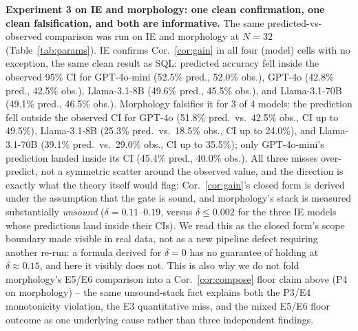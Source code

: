 \documentclass[11pt]{article}
\begin{document}
\textbf{Experiment 3 on IE and morphology: one clean confirmation, one clean falsification, and both are informative.} The same predicted-vs-observed comparison was run on IE and morphology at $N=32$ (Table~\ref{tab:params}). IE confirms Cor.~\ref{cor:gain} in all four (model) cells with no exception, the same clean result as SQL: predicted accuracy fell inside the observed 95\% CI for GPT-4o-mini (52.5\% pred., 52.0\% obs.), GPT-4o (42.8\% pred., 42.5\% obs.), Llama-3.1-8B (49.6\% pred., 45.5\% obs.), and Llama-3.1-70B (49.1\% pred., 46.5\% obs.). Morphology falsifies it for 3 of 4 models: the prediction fell outside the observed CI for GPT-4o (51.8\% pred.\ vs.\ 42.5\% obs., CI up to 49.5\%), Llama-3.1-8B (25.3\% pred.\ vs.\ 18.5\% obs., CI up to 24.0\%), and Llama-3.1-70B (39.1\% pred.\ vs.\ 29.0\% obs., CI up to 35.5\%); only GPT-4o-mini's prediction landed inside its CI (45.4\% pred., 40.0\% obs.). All three misses over-predict, not a symmetric scatter around the observed value, and the direction is exactly what the theory itself would flag: Cor.~\ref{cor:gain}'s closed form is derived under the assumption that the gate is sound, and morphology's stack is measured substantially \emph{unsound} ($\delta=0.11$--$0.19$, versus $\delta\le0.002$ for the three IE models whose predictions land inside their CIs). We read this as the closed form's scope boundary made visible in real data, not as a new pipeline defect requiring another re-run: a formula derived for $\delta=0$ has no guarantee of holding at $\delta\approx0.15$, and here it visibly does not. This is also why we do not fold morphology's E5/E6 comparison into a Cor.~\ref{cor:compose} floor claim above (P4 on morphology) -- the same unsound-stack fact explains both the P3/E4 monotonicity violation, the E3 quantitative miss, and the mixed E5/E6 floor outcome as one underlying cause rather than three independent findings.
\end{document}
